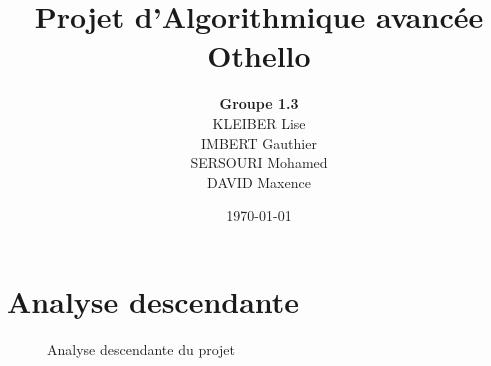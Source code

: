 \documentclass[11pt,a4paper]{report}
\title{Projet d'Algorithmique avancée\\ \huge Othello}
\author{\textbf{Groupe 1.3}\\KLEIBER Lise\\IMBERT Gauthier\\SERSOURI Mohamed\\DAVID Maxence}
\date{\today}
\begin{document}
\maketitle
\tableofcontents





\chapter{Analyse descendante}

\begin{figure}[h]
\centering
\caption{Analyse descendante du projet}
\end{figure}











\end{document}
